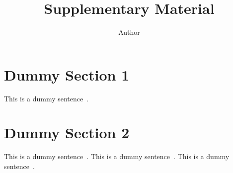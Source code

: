\documentclass[twocolumn]{article}
\title{Supplementary Material}
\author{Author}
\begin{document}
\maketitle

\begin{appendices}

\renewcommand{\thealgorithm}{S\arabic{algorithm}}
\renewcommand{\thefigure}{S\arabic{figure}}
\renewcommand{\thesection}{S\arabic{section}}
\renewcommand{\thetable}{S\arabic{table}}

\section{Dummy Section 1}
\label{sec:dummy1}

This is a dummy sentence~\cite{Authors14}.
 \section{Dummy Section 2}
\label{sec:dummy2}

This is a dummy sentence~\cite{Alpher02}. This is a dummy sentence~\cite{Alpher03}. This is a dummy sentence~\cite{Alpher04}.

\end{appendices}



\end{document}
